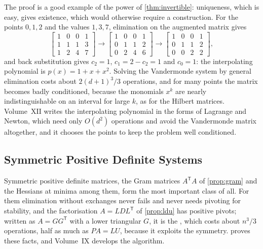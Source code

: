 The proof is a good example of the power of \cref{thm:invertible}: uniqueness, which is easy, gives existence, which would otherwise require a construction. For the points $0,1,2$ and the values $1,3,7$, elimination on the augmented matrix gives
\[
\left[\begin{array}{rrr|r}1&0&0&1\\1&1&1&3\\1&2&4&7\end{array}\right]
\longrightarrow
\left[\begin{array}{rrr|r}1&0&0&1\\0&1&1&2\\0&2&4&6\end{array}\right]
\longrightarrow
\left[\begin{array}{rrr|r}1&0&0&1\\0&1&1&2\\0&0&2&2\end{array}\right],
\]
and back substitution gives $c_2=1$, $c_1=2-c_2=1$ and $c_0=1$: the interpolating polynomial is $p(x)=1+x+x^2$. Solving the Vandermonde system by general elimination costs about $2(d+1)^3/3$ operations, and for many points the matrix becomes badly conditioned, because the monomials $x^k$ are nearly indistinguishable on an interval for large $k$, as for the Hilbert matrices. Volume~XII writes the interpolating polynomial in the forms of Lagrange and Newton, which need only $O(d^2)$ operations and avoid the Vandermonde matrix altogether, and it chooses the points to keep the problem well conditioned.

\subsection{Symmetric Positive Definite Systems}

Symmetric positive definite matrices, the Gram matrices $A^{\mathsf T}A$ of \cref{prop:gram} and the Hessians at minima among them, form the most important class of all. For them elimination without exchanges never fails and never needs pivoting for stability, and the factorisation $A=LDL^{\mathsf T}$ of \cref{prop:ldu} has positive pivots; written as $A=GG^{\mathsf T}$ with a lower triangular $G$, it is the , which costs about $n^3/3$ operations, half as much as $PA=LU$, because it exploits the symmetry.  proves these facts, and Volume~IX develops the algorithm.

